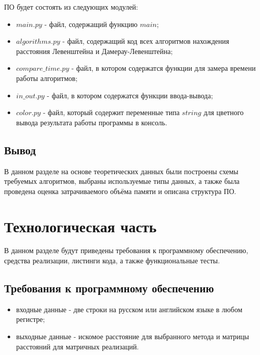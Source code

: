 \documentclass[a4paper,14pt, unknownkeysallowed]{extreport}
\begin{document}
ПО будет состоять из следующих модулей:

\begin{itemize}
	\item $main.py$ - файл, содержащий функцию $main$;
    \item $algorithms.py$ - файл, содержащий код всех алгоритмов нахождения расстояния Левенштейна и Дамерау-Левенштейна;
    \item $compare\_time.py$ - файл, в котором содержатся функции для замера времени работы алгоритмов;
    \item $in\_out.py$ - файл, в котором содержатся функции ввода-вывода;
    \item $color.py$ - файл, который содержит переменные типа $string$ для цветного вывода результата работы программы в консоль.
\end{itemize}

\section{Вывод}

В данном разделе на основе теоретических данных были построены схемы требуемых алгоритмов, выбраны используемые типы данных, а также была проведена оценка затрачиваемого объёма памяти и описана структура ПО.

\clearpage





\chapter{Технологическая часть}

В данном разделе будут приведены требования к программному обеспечению, средства реализации, листинги кода, а также функциональные тесты.

\section{Требования к программному обеспечению}

\begin{itemize}
    \item входные данные - две строки на русском или английском языке в любом регистре;
    \item выходные данные - искомое расстояние для выбранного метода и матрицы расстояний для матричных реализаций.
\end{itemize}
\end{document}
